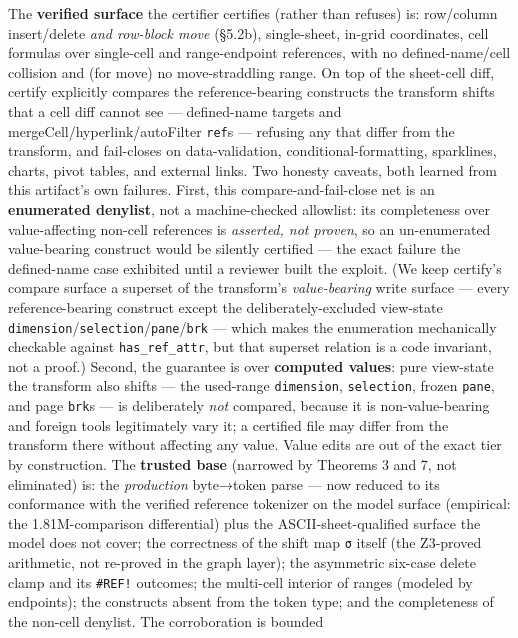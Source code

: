 \documentclass[
  11pt,
]{article}
\begin{document}
The \textbf{verified surface} the certifier certifies (rather than
refuses) is: row/column insert/delete \emph{and row-block move} (§5.2b),
single-sheet, in-grid coordinates, cell formulas over single-cell and
range-endpoint references, with no defined-name/cell collision and (for
move) no move-straddling range. On top of the sheet-cell diff, certify
explicitly compares the reference-bearing constructs the transform
shifts that a cell diff cannot see --- defined-name targets and
mergeCell/hyperlink/autoFilter \texttt{ref}s --- refusing any that
differ from the transform, and fail-closes on data-validation,
conditional-formatting, sparklines, charts, pivot tables, and external
links. Two honesty caveats, both learned from this artifact's own
failures. First, this compare-and-fail-close net is an
\textbf{enumerated denylist}, not a machine-checked allowlist: its
completeness over value-affecting non-cell references is \emph{asserted,
not proven}, so an un-enumerated value-bearing construct would be
silently certified --- the exact failure the defined-name case exhibited
until a reviewer built the exploit. (We keep certify's compare surface a
superset of the transform's \emph{value-bearing} write surface --- every
reference-bearing construct except the deliberately-excluded view-state
\texttt{dimension}/\texttt{selection}/\texttt{pane}/\texttt{brk} ---
which makes the enumeration mechanically checkable against
\texttt{has\_ref\_attr}, but that superset relation is a code invariant,
not a proof.) Second, the guarantee is over \textbf{computed values}:
pure view-state the transform also shifts --- the used-range
\texttt{dimension}, \texttt{selection}, frozen \texttt{pane}, and page
\texttt{brk}s --- is deliberately \emph{not} compared, because it is
non-value-bearing and foreign tools legitimately vary it; a certified
file may differ from the transform there without affecting any value.
Value edits are out of the exact tier by construction. The
\textbf{trusted base} (narrowed by Theorems 3 and 7, not eliminated) is:
the \emph{production} byte→token parse --- now reduced to its
conformance with the verified reference tokenizer on the model surface
(empirical: the 1.81M-comparison differential) plus the
ASCII-sheet-qualified surface the model does not cover; the correctness
of the shift map \texttt{σ} itself (the Z3-proved arithmetic, not
re-proved in the graph layer); the asymmetric six-case delete clamp and
its \texttt{\#REF!} outcomes; the multi-cell interior of ranges (modeled
by endpoints); the constructs absent from the token type; and the
completeness of the non-cell denylist. The corroboration is bounded
\end{document}
